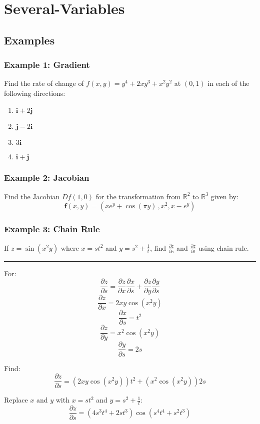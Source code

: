 \section{Several-Variables}

\subsection{Examples}
\subsubsection{Example 1: Gradient}
Find the rate of change of $f(x,y)=y^4+2xy^3+x^2y^2$ at $(0,1)$ in each of the following directions:
\begin{enumerate}
  \item $\mathbf{i}+2\mathbf{j}$
  \item $\mathbf{j}-2\mathbf{i}$
  \item $3\mathbf{i}$
  \item $\mathbf{i}+\mathbf{j}$
\end{enumerate}

\subsubsection{Example 2: Jacobian}
Find the Jacobian $Df(1,0)$ for the transformation from $\mathbb{R}^2$ to $\mathbb{R}^3$ given by:
$$\mathbf{f}(x,y)=(x e^{y}+\cos(\pi y)\,,x^{2},x-e^{y})$$

\subsubsection{Example 3: Chain Rule}
If $z=\sin(x^2y)$ where $x=st^2$ and $y=s^2+\frac{1}{t}$, find $\frac{\partial z}{\partial s}$ and $\frac{\partial z}{\partial t}$ using chain rule.

\noindent\rule{\textwidth}{1pt}

For: 
$${\frac{\partial z}{\partial s}}={\frac{\partial z}{\partial x}}{\frac{\partial x}{\partial s}}+{\frac{\partial z}{\partial y}}{\frac{\partial y}{\partial s}}$$
$${\frac{\partial z}{\partial x}}=2xy\cos(x^2y)$$
$${\frac{\partial x}{\partial s}}=t^2$$
$${\frac{\partial z}{\partial y}}=x^2\cos(x^2y)$$
$${\frac{\partial y}{\partial s}}=2s$$

Find:
$${\frac{\partial z}{\partial s}}=(2xy\cos(x^2y))t^2+(x^2\cos(x^2y))2s$$

Replace $x$ and $y$ with $x=st^2$ and $y=s^2+\frac{1}{t}$:
$$\frac{\partial z}{\partial s}=(4s^3t^4+2st^3)\cos(s^4t^4+s^2t^3)$$

